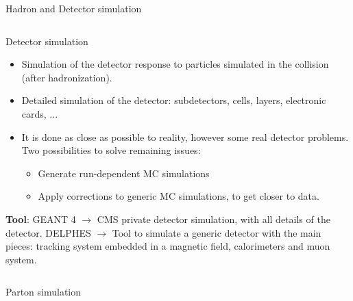 \begin{frame}{Hadron and Detector simulation}
\begin{columns}
\begin{column}{.50\textwidth}
  \begin{block}{Detector simulation}\scriptsize
    \begin{itemize}
    \item Simulation of the detector response to particles simulated in the collision (after hadronization).
    \item Detailed simulation of the detector: subdetectors, cells, layers, electronic cards, ...
    \item It is done as close as possible to reality, however some real detector problems. Two possibilities to solve remaining issues:
      \begin{itemize}\scriptsize
      \item Generate run-dependent MC simulations
      \item Apply corrections to generic MC simulations, to get closer to data.
      \end{itemize}
    \end{itemize}
  \end{block}
\vspace{-.3cm}
\begin{block}{}\tiny
\textbf{Tool}: GEANT 4 $\to$ CMS private detector simulation, with all details of the detector. DELPHES $\to$ Tool to simulate a generic detector with the main pieces: tracking system embedded in a magnetic field, calorimeters and muon system.
\end{block}

\end{column}

\end{columns}
\end{frame}


\begin{frame}{Parton simulation}
\vspace{-.2cm}

\begin{columns}
\begin{column}{.50\textwidth}
  \begin{block}{}
    \tiny \centering 
  \end{block}
\end{column}

\begin{column}{.50\textwidth}

\end{column}

\end{columns}
\end{frame}